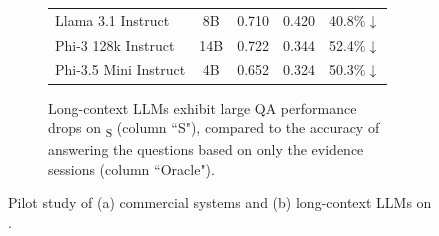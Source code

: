 \begin{figure}[t]
\begin{subfigure}{0.49\textwidth}
{\begin{tabular}{l c c c c}
Llama 3.1 Instruct & 8B & 0.710 & 0.420 & 40.8\%$\downarrow$ \\
Phi-3 128k Instruct & 14B & 0.722 & 0.344 & 52.4\%$\downarrow$ \\
Phi-3.5 Mini Instruct & 4B & 0.652 & 0.324 & 50.3\%$\downarrow$ \\
\bottomrule
\end{tabular}
}
 \caption{{Long-context LLMs exhibit large QA performance drops on \BENCHMARK\textsubscript{\textsc{S}} (column ``\textsc{S}"), compared to the accuracy of answering the questions based on only the evidence sessions (column ``Oracle").}}
 \label{fig:proof-of-difficulty-long-context}
 \end{subfigure}
 \caption{Pilot study of {(a)} commercial systems and {(b)} long-context LLMs on \BENCHMARK.}
 \label{fig:proof-of-difficulty}
 \vspace{-3mm}
\end{figure}



